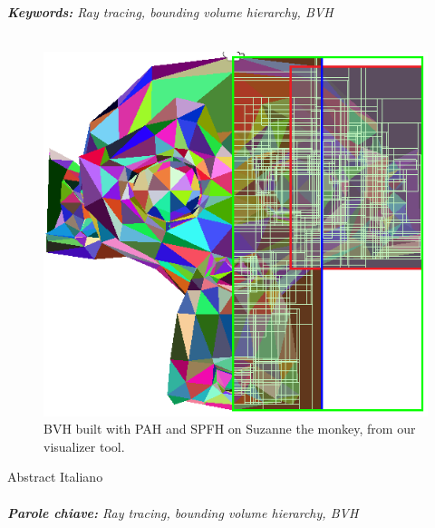 \documentclass{PoliMi_MasterThesis}
\begin{document}
\small
\textit{\textbf{Keywords:} Ray tracing, bounding volume hierarchy, BVH}
\normalsize
\\\\
\begin{figure}[H]
    \centering
    \includegraphics[width=\textwidth*\real{0.7}]{Images/abstract_image.png}
	\caption{BVH built with PAH and SPFH on Suzanne the monkey, from our visualizer tool.}
\end{figure}


\makeatletter
\let\savedchap\@makechapterhead
\def\@makechapterhead{\savedchap}
\let\@makechapterhead\savedchap
\makeatletter
Abstract Italiano
\\
\\
\textit{\textbf{Parole chiave:} Ray tracing, bounding volume hierarchy, BVH}


\thispagestyle{empty}
\tableofcontents %
\thispagestyle{empty}
\cleardoublepage

\mainmatter %
\end{document}
